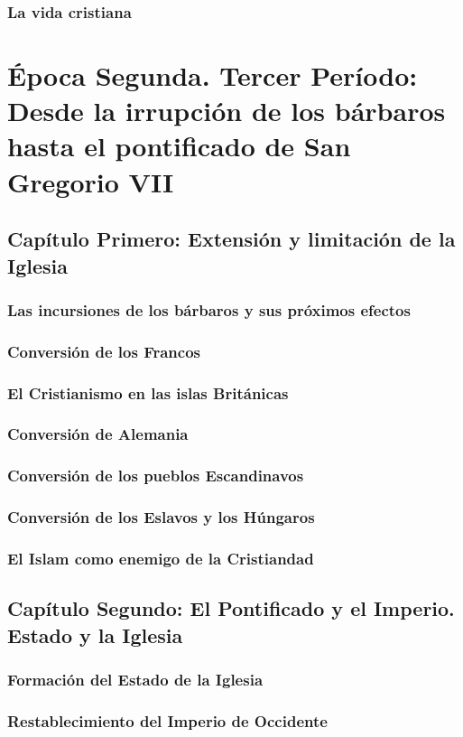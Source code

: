 \raggedbottom{} \documentclass[12pt, a4paper]{book}
\begin{document}
\section{La vida cristiana}
\part{Época Segunda. Tercer Período: Desde la irrupción de los bárbaros hasta el pontificado de San Gregorio VII}
\chapter{Capítulo Primero: Extensión y limitación de la Iglesia}
\section{Las incursiones de los bárbaros y sus próximos efectos}
\section{Conversión de los Francos}
\section{El Cristianismo en las islas Británicas}
\section{Conversión de Alemania}
\section{Conversión de los pueblos Escandinavos}
\section{Conversión de los Eslavos y los Húngaros}
\section{El Islam como enemigo de la Cristiandad}
\chapter{Capítulo Segundo: El Pontificado y el Imperio. Estado y la Iglesia}
\section{Formación del Estado de la Iglesia}
\section{Restablecimiento del Imperio de Occidente}
\end{document}
